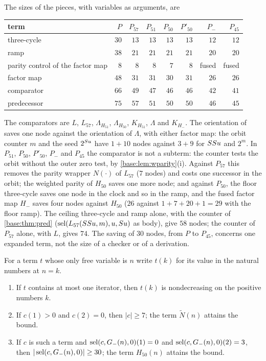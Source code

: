 The sizes of the pieces, with variables as arguments, are
\begin{center}
\begin{tabular}{lrrrrrrr}
\hline
term & $P$ & $P_{57}$ & $P_{51}$ & $P_{50}$ & $P'_{50}$ & $P_-$ & $P_{45}$\\
\hline
three-cycle & $30$ & $13$ & $13$ & $13$ & $13$ & $12$ & $12$\\
ramp & $38$ & $21$ & $21$ & $21$ & $21$ & $20$ & $20$\\
parity control of the factor map & $8$ & $8$ & $8$ & $7$ & $8$ & fused & fused\\
factor map & $48$ & $31$ & $31$ & $30$ & $31$ & $26$ & $26$\\
comparator & $66$ & $49$ & $47$ & $46$ & $46$ & $42$ & $41$\\
predecessor & $75$ & $57$ & $51$ & $50$ & $50$ & $46$ & $45$\\
\hline
\end{tabular}
\end{center}
The comparators are $L$, $L_{57}$, $\Lambda_{H_{51}}$, $\Lambda_{H_{50}}$,
$K_{H_{51}}$, $\Lambda$ and $K_{H_-}$.  The orientation of  saves
one node against the orientation of $\Lambda$, with either factor map: the
orbit counter $m$ and the seed $2^{S u}$ have $1+10$ nodes against $3+9$
for $SS u$ and $2^{m}$.  In $P_{51}$, $P_{50}$, $P'_{50}$, $P_-$ and
$P_{45}$ the comparator is
not a subterm: the counter tests the orbit without the outer zero test, by
\cref{base:lem:wparity}(i).  Against $P_{57}$ this removes the parity wrapper
$N(\cdot)$ of $L_{57}$ ($7$ nodes) and costs one successor in the orbit;
the weighted parity of $H_{50}$ saves one more node; and against $P_{50}$,
the floor three-cycle saves one node in the clock and so in the ramp, and the
fused factor map $H_-$ saves four nodes against $H_{50}$ ($26$ against
$1+7+20+1=29$ with the floor ramp).  The ceiling three-cycle and ramp alone,
with the counter of \cref{base:thm:pred} ($\operatorname{sel}(L_{57}(SS u,m),u,S u)$
as body), give $58$ nodes; the counter of $P_{57}$ alone, with $L$, gives
$74$.  The saving of $30$ nodes, from $P$ to $P_{45}$, concerns one expanded
term, not the size of a checker or of a derivation.

\begin{proposition}
\label{base:prop:control-bound}
For a term $t$ whose only free variable is $n$ write $t(k)$ for its value in
the natural numbers at $n=k$.
\begin{enumerate}[label=\textup{(\roman*)}]
\item If $t$ contains at most one iterator, then $t(k)$ is nondecreasing on
 the positive numbers $k$.
\item If $c(1)>0$ and $c(2)=0$, then $|c|\ge 7$; the term $\tilde N(n)$
 attains the bound.
\item If $c$ is such a term and $\operatorname{sel}(c,G_-(n),0)(1)=0$ and
 $\operatorname{sel}(c,G_-(n),0)(2)=3$, then $|\operatorname{sel}(c,G_-(n),0)|\ge 30$; the term
 $H_{50}(n)$ attains the bound.
\end{enumerate}
\end{proposition}

